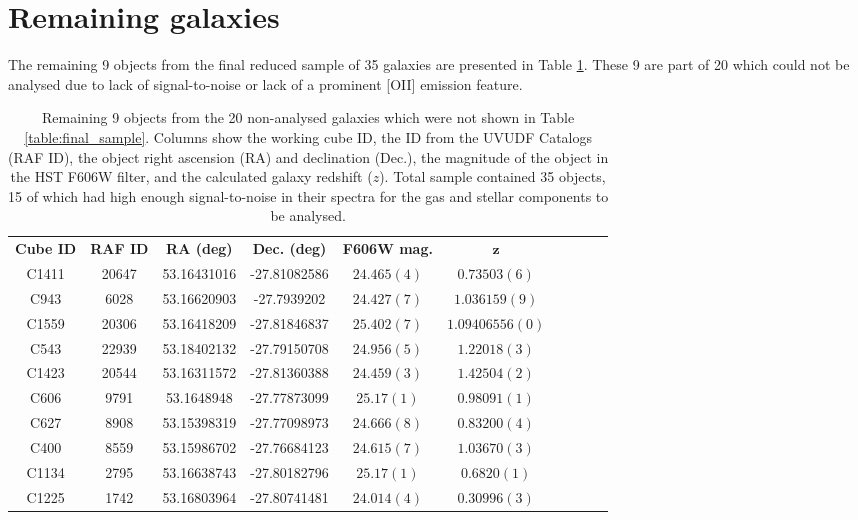 \documentclass[12pt, twocolumn]{revtex4-1}    %
\begin{document}
\section{Remaining galaxies} \label{appendix:rest_of_final_sample}
\noindent
The remaining 9 objects from the final reduced sample of 35 galaxies are presented in Table \ref{table:rest_of_final_sample}. These 9 are part of 20 which could not be analysed due to lack of signal-to-noise or lack of a prominent [OII] emission feature.

\begin{table}[h!]
\centering
\begin{tabular}{c@{\hskip 10pt}c@{\hskip 10pt}c@{\hskip 10pt}c@{\hskip 10pt}c@{\hskip 10pt}c@{\hskip 10pt}c@{\hskip 10pt}c@{\hskip 10pt}c@{\hskip 10pt}c} 
 \hline
 \textbf{Cube ID} & \textbf{RAF ID} & \textbf{RA (deg)} & \textbf{Dec. (deg)} & \textbf{F606W mag.} & \textbf{$\boldsymbol{z}$}  \\ [0.5ex] 
C1411 & 20647 & 53.16431016 & -27.81082586 & $24.465(4)$ & $0.73503(6)$ \\ 

C943 & 6028 & 53.16620903 & -27.7939202 & $24.427(7)$ & $1.036159(9)$ \\ 

C1559 & 20306 & 53.16418209 & -27.81846837 & $25.402(7)$ & $1.09406556(0)$ \\ 

C543 & 22939 & 53.18402132 & -27.79150708 & $24.956(5)$ & $1.22018(3)$ \\ 

C1423 & 20544 & 53.16311572 & -27.81360388 & $24.459(3)$ & $1.42504(2)$ \\ 

C606 & 9791 & 53.1648948 & -27.77873099 & $25.17(1)$ & $0.98091(1)$ \\ 

C627 & 8908 & 53.15398319 & -27.77098973 & $24.666(8)$ & $0.83200(4)$ \\ 

C400 & 8559 & 53.15986702 & -27.76684123 & $24.615(7)$ & $1.03670(3)$ \\ 

C1134 & 2795 & 53.16638743 & -27.80182796 & $25.17(1)$ & $0.6820(1)$ \\ 

C1225 & 1742 & 53.16803964 & -27.80741481 & $24.014(4)$ & $0.30996(3)$ \\ 
 \hline
\end{tabular}
\caption{Remaining 9 objects from the 20 non-analysed galaxies which were not shown in Table \ref{table:final_sample}. Columns show the working cube ID, the ID from the UVUDF Catalogs \citep{2015AJ....150...31R} (RAF ID), the object right ascension (RA) and declination (Dec.), the magnitude of the object in the HST F606W filter, and the calculated galaxy redshift ($z$). Total sample contained 35 objects, 15 of which had high enough signal-to-noise in their spectra for the gas and stellar components to be analysed.}
\label{table:rest_of_final_sample}
\end{table}
\end{document}
